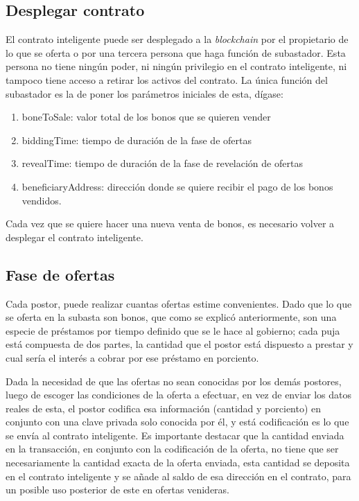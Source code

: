     \subsection{Desplegar contrato}
      El contrato inteligente puede ser desplegado a la \textit{blockchain} por el propietario de lo que se oferta
      o por una tercera persona que haga función de subastador. Esta persona no tiene ningún poder, ni ningún
      privilegio en el contrato inteligente, ni tampoco tiene acceso a retirar los activos del contrato. La única función del subastador 
      es la de poner los parámetros iniciales de esta, dígase: 
    
      \begin{enumerate}
        \item boneToSale: valor total de los bonos que se quieren vender
        \item biddingTime: tiempo de duración de la fase de ofertas
        \item revealTime: tiempo de duración de la fase de revelación de ofertas
        \item beneficiaryAddress: dirección donde se quiere recibir el pago de los bonos vendidos.
      \end{enumerate}

      Cada vez que se quiere hacer una nueva venta de bonos, es necesario volver a desplegar el contrato inteligente.

    \subsection{Fase de ofertas}
      Cada postor, puede realizar cuantas ofertas estime convenientes. Dado que lo que se oferta en la subasta son 
      bonos, que como se explicó anteriormente, son una especie de préstamos por tiempo definido que se le hace al gobierno; cada puja está
      compuesta de dos partes, la cantidad que el postor está dispuesto a prestar y cual sería el interés a cobrar por ese préstamo en 
      porciento. 

      Dada la necesidad de que las ofertas no sean conocidas por los demás postores, luego de escoger las condiciones de la oferta a 
      efectuar, 
      en vez de enviar los datos reales de esta, el postor codifica esa información (cantidad y porciento) en conjunto con una clave
      privada solo conocida por él, y está codificación es lo que se envía al contrato inteligente. Es importante destacar que la cantidad
      enviada en la transacción, en conjunto con la codificación de la oferta, no tiene que ser necesariamente la cantidad exacta de la 
      oferta enviada, esta cantidad se deposita en el contrato inteligente y se añade al saldo de esa dirección en el contrato, para un 
      posible uso posterior de este en ofertas venideras.

